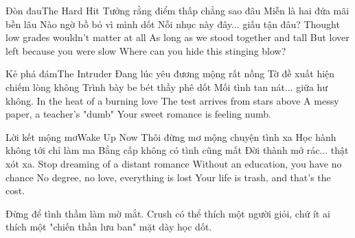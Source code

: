 \begin{tutuyetbox}{Đòn đau}{The Hard Hit}
Tưởng rằng điểm thấp chẳng sao đâu
Miễn là hai đứa mãi bền lâu
Nào ngờ bồ bỏ vì mình dốt
Nỗi nhục này đây... giấu tận đâu?
\tcblower
Thought low grades wouldn't matter at all
As long as we stood together and tall
But lover left because you were slow
Where can you hide this stinging blow?
\end{tutuyetbox}

\begin{tutuyetbox}{Kẻ phá đám}{The Intruder}
Đang lúc yêu đương mộng rất nồng
Tờ đề xuất hiện chiếm lòng không
Trình bày be bét thầy phê dốt
Mối tình tan nát... giữa hư không.
\tcblower
In the heat of a burning love
The test arrives from stars above
A messy paper, a teacher's "dumb"
Your sweet romance is feeling numb.
\end{tutuyetbox}

\begin{tutuyetbox}{Lời kết mộng mơ}{Wake Up Now}
Thôi đừng mơ mộng chuyện tình xa
Học hành không tới chỉ làm ma
Bằng cấp không có tình cũng mất
Đời thành mớ rác... thật xót xa.
\tcblower
Stop dreaming of a distant romance
Without an education, you have no chance
No degree, no love, everything is lost
Your life is trash, and that's the cost.
\end{tutuyetbox}

\begin{ghichu}
Đừng để tình thầm làm mờ mắt. Crush có thể thích một người giỏi, chứ ít ai thích một "chiến thần lưu ban" mặt dày học dốt.
\end{ghichu}